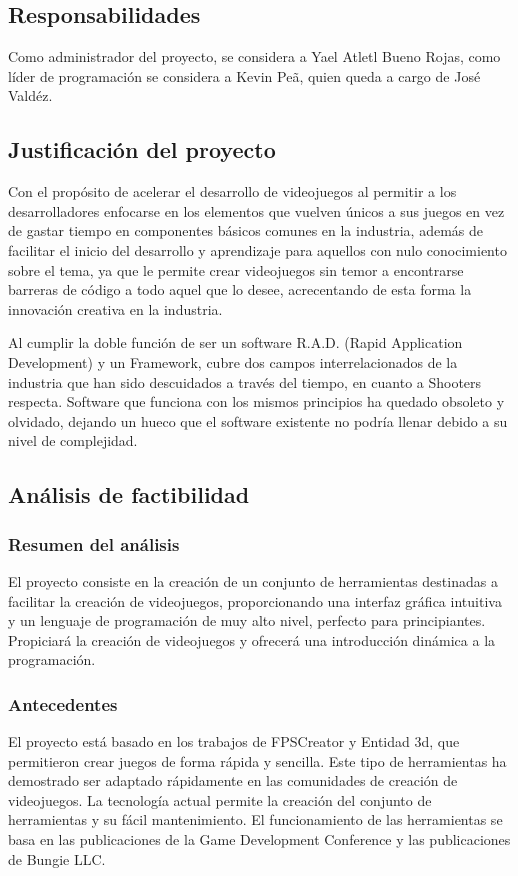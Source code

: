 \documentclass[]{article}
\begin{document}
\subsection{Responsabilidades}
Como administrador del proyecto, se considera a Yael Atletl Bueno Rojas, como l\'ider de programaci\'on se considera a Kevin Pe\~a, quien queda a cargo de Jos\'e Vald\'ez.
\subsection{Justificaci\'on del proyecto}
Con el prop\'osito de acelerar el desarrollo de videojuegos al permitir a los desarrolladores enfocarse en los elementos que vuelven \'unicos a sus
juegos en vez de gastar tiempo en componentes b\'asicos comunes en la industria, adem\'as de facilitar el inicio del desarrollo y aprendizaje para aquellos con nulo conocimiento sobre el tema, ya que le permite crear videojuegos sin temor a encontrarse barreras de c\'odigo a todo aquel que lo desee, acrecentando de esta forma la innovaci\'on creativa en la industria.

Al cumplir la doble funci\'on de ser un software R.A.D. (Rapid Application Development) y un Framework, cubre dos campos interrelacionados de la industria que han sido descuidados a trav\'es del tiempo, en cuanto a Shooters respecta. 
Software que funciona con los mismos principios ha quedado obsoleto y olvidado, dejando un hueco que el software existente no podr\'ia llenar debido a su nivel de complejidad.

\subsection{An\'alisis de factibilidad}
\subsubsection{Resumen del an\'alisis}
El proyecto consiste en la creaci\'on de un conjunto de herramientas destinadas a facilitar la creaci\'on de videojuegos, proporcionando una interfaz gr\'afica intuitiva y un lenguaje de programaci\'on de muy alto nivel, perfecto para principiantes.
Propiciar\'a la creaci\'on de videojuegos y ofrecer\'a una introducci\'on din\'amica a la programaci\'on.
\subsubsection{Antecedentes}
El proyecto est\'a basado en los trabajos de FPSCreator y Entidad 3d, que permitieron crear juegos de forma r\'apida y sencilla.
Este tipo de herramientas ha demostrado ser adaptado r\'apidamente en las comunidades de creaci\'on de videojuegos. La tecnolog\'ia actual permite la creaci\'on del conjunto de herramientas y su f\'acil mantenimiento.
El funcionamiento de las herramientas se basa en las publicaciones de la Game Development Conference y las publicaciones de Bungie LLC.
\end{document}
